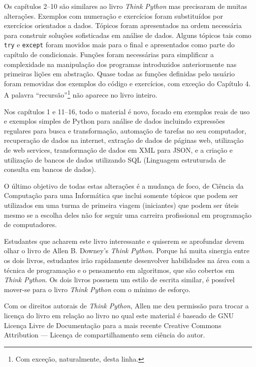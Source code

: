 Os capítulos 2--10 são similares ao livro \emph{Think Python}
mas precisaram de muitas alterações. Exemplos com numeração e
exercícios foram substituídos por exercícios orientados a dados.
Tópicos foram apresentados na ordem necessária para construir
soluções sofisticadas em análise de dados. Alguns tópicos tais como {\tt try}
e {\tt except} foram movidos mais para o final e apresentados como parte do
capítulo de condicionais. Funções foram necessárias para simplificar
a complexidade na manipulação dos programas introduzidos anteriormente
nas primeiras lições em abstração. Quase todas as funções definidas pelo usuário
foram removidas dos exemplos do código e exercícios, com exceção do Capítulo 4.
A palavra ``recursão''\footnote{Com exceção, naturalmente, desta linha.}
não aparece no livro inteiro.

Nos capítulos 1 e 11--16, todo o material é novo, focado
em exemplos reais de uso e exemplos simples de Python para análise de dados
incluindo expressões regulares para busca e transformação,
automação de tarefas no seu computador, recuperação de dados na internet,
extração de dados de páginas web, utilização de web services, transformação
de dados em XML para JSON, e a criação e utilização de bancos de dados utilizando
SQL (Linguagem estruturada de consulta em bancos de dados).

O último objetivo de todas estas alterações é a mudança de foco, de
Ciência da Computação para uma Informática que inclui somente tópicos
que podem ser utilizados em uma turma de primeira viagem (iniciantes) que
podem ser úteis mesmo se a escolha deles não for seguir uma carreira
profissional em programação de computadores.

Estudantes que acharem este livro interessante e quiserem se aprofundar
devem olhar o livro de Allen B. Downey's \emph{Think Python}. Porque há
muita sinergia entre os dois livros, estudantes irão rapidamente desenvolver
habilidades na área com a técnica de programação e o pensamento
em algoritmos, que são cobertos em \emph{Think Python}.
Os dois livros possuem um estilo de escrita similar, é possível
mover-se para o livro \emph{Think Python} com o mínimo de esforço.

Com os direitos autorais de \emph{Think Python},
Allen me deu permissão para trocar a licença do livro
em relação ao livro no qual este material é baseado de 
GNU Licença Livre de Documentação para a mais recente
Creative Commons Attribution --- Licença de compartilhamento sem 
ciência do autor.

